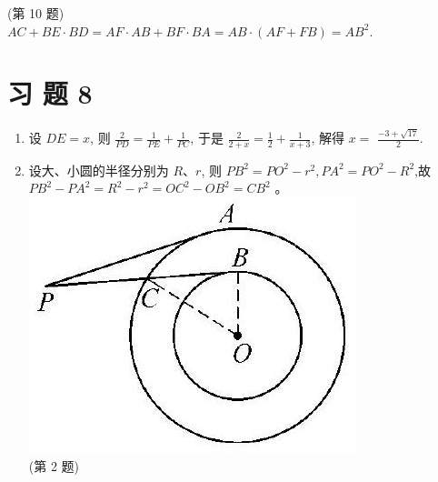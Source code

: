 \documentclass[10pt]{article}
\begin{document}
(第 10 题)\\
$A C+B E \cdot B D=A F \cdot A B+B F \cdot B A=A B \cdot(A F+F B)=A B^{2}$.

\section*{习 题 8}
\begin{enumerate}
  \item 设 $D E=x$, 则 $\frac{2}{P D}=\frac{1}{P E}+\frac{1}{P C}$, 于是 $\frac{2}{2+x}=\frac{1}{2}+\frac{1}{x+3}$, 解得 $x=$ $\frac{-3+\sqrt{17}}{2}$.
  \item 设大、小圆的半径分别为 $R 、 r$, 则 $P B^{2}=P O^{2}-r^{2}, P A^{2}=P O^{2}-R^{2}$,故 $P B^{2}-P A^{2}=R^{2}-r^{2}=O C^{2}-O B^{2}=C B^{2}$ 。\\
\includegraphics[max width=\textwidth, center]{2024_10_30_66b8e5e701da2093c133g-100(1)}\\
(第 2 题)\\

\end{enumerate}
\end{document}
